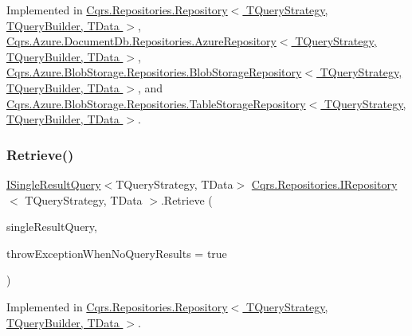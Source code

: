 Implemented in \hyperlink{classCqrs_1_1Repositories_1_1Repository_a444e9dfe4710be90940dbb6dec9d856f}{Cqrs.\+Repositories.\+Repository$<$ T\+Query\+Strategy, T\+Query\+Builder, T\+Data $>$}, \hyperlink{classCqrs_1_1Azure_1_1DocumentDb_1_1Repositories_1_1AzureRepository_a22c58163e101a6cb80f891bed6114380}{Cqrs.\+Azure.\+Document\+Db.\+Repositories.\+Azure\+Repository$<$ T\+Query\+Strategy, T\+Query\+Builder, T\+Data $>$}, \hyperlink{classCqrs_1_1Azure_1_1BlobStorage_1_1Repositories_1_1BlobStorageRepository_a7c5a3ca4d92cf4954508fb3e583eb49e}{Cqrs.\+Azure.\+Blob\+Storage.\+Repositories.\+Blob\+Storage\+Repository$<$ T\+Query\+Strategy, T\+Query\+Builder, T\+Data $>$}, and \hyperlink{classCqrs_1_1Azure_1_1BlobStorage_1_1Repositories_1_1TableStorageRepository_a7238452f19c9d51b5733df7701920605}{Cqrs.\+Azure.\+Blob\+Storage.\+Repositories.\+Table\+Storage\+Repository$<$ T\+Query\+Strategy, T\+Query\+Builder, T\+Data $>$}.

\mbox{\label{interfaceCqrs_1_1Repositories_1_1IRepository_a65848508067b81e82da72af2063f2c07}} 
\subsubsection{\texorpdfstring{Retrieve()}{Retrieve()}\hspace{0.1cm}{\footnotesize\ttfamily [1/2]}}
{\footnotesize\ttfamily \hyperlink{interfaceCqrs_1_1Repositories_1_1Queries_1_1ISingleResultQuery}{I\+Single\+Result\+Query}$<$T\+Query\+Strategy, T\+Data$>$ \hyperlink{interfaceCqrs_1_1Repositories_1_1IRepository}{Cqrs.\+Repositories.\+I\+Repository}$<$ T\+Query\+Strategy, T\+Data $>$.Retrieve (\begin{DoxyParamCaption}\item[{\hyperlink{interfaceCqrs_1_1Repositories_1_1Queries_1_1ISingleResultQuery}{I\+Single\+Result\+Query}$<$ T\+Query\+Strategy, T\+Data $>$}]{single\+Result\+Query,  }\item[{bool}]{throw\+Exception\+When\+No\+Query\+Results = {\ttfamily true} }\end{DoxyParamCaption})}



Implemented in \hyperlink{classCqrs_1_1Repositories_1_1Repository_a4f83093a92d8141cdc2b908bbbd97f32}{Cqrs.\+Repositories.\+Repository$<$ T\+Query\+Strategy, T\+Query\+Builder, T\+Data $>$}.

